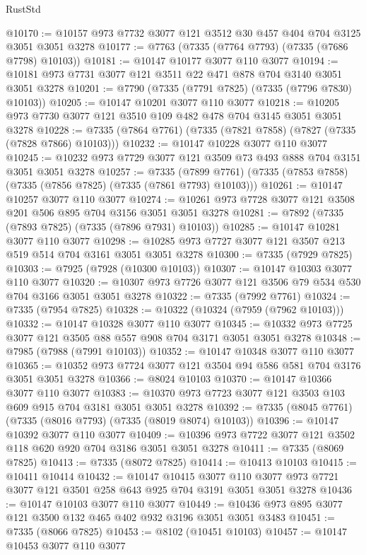 \begin{lexlean}{RustStd}
\begin{coremodule}
{\begin{coremodule}
{{{{{{{{{{{{{{{{{{{{{{{{{{{{{{{{@10170 := @10157 @973 @7732 @3077 @121 @3512 @30 @457 @404 @704 @3125 @3051 @3051 @3278
@10177 := @7763 (@7335 (@7764 @7793) (@7335 (@7686 @7798) @10103))
@10181 := @10147 @10177 @3077 @110 @3077
@10194 := @10181 @973 @7731 @3077 @121 @3511 @22 @471 @878 @704 @3140 @3051 @3051 @3278
@10201 := @7790 (@7335 (@7791 @7825) (@7335 (@7796 @7830) @10103))
@10205 := @10147 @10201 @3077 @110 @3077
@10218 := @10205 @973 @7730 @3077 @121 @3510 @109 @482 @478 @704 @3145 @3051 @3051 @3278
@10228 := @7335 (@7864 @7761) (@7335 (@7821 @7858) (@7827 (@7335 (@7828 @7866) @10103)))
@10232 := @10147 @10228 @3077 @110 @3077
@10245 := @10232 @973 @7729 @3077 @121 @3509 @73 @493 @888 @704 @3151 @3051 @3051 @3278
@10257 := @7335
    (@7899 @7761)
    (@7335 (@7853 @7858) (@7335 (@7856 @7825) (@7335 (@7861 @7793) @10103)))
@10261 := @10147 @10257 @3077 @110 @3077
@10274 := @10261 @973 @7728 @3077 @121 @3508 @201 @506 @895 @704 @3156 @3051 @3051 @3278
@10281 := @7892 (@7335 (@7893 @7825) (@7335 (@7896 @7931) @10103))
@10285 := @10147 @10281 @3077 @110 @3077
@10298 := @10285 @973 @7727 @3077 @121 @3507 @213 @519 @514 @704 @3161 @3051 @3051 @3278
@10300 := @7335 (@7929 @7825)
@10303 := @7925 (@7928 (@10300 @10103))
@10307 := @10147 @10303 @3077 @110 @3077
@10320 := @10307 @973 @7726 @3077 @121 @3506 @79 @534 @530 @704 @3166 @3051 @3051 @3278
@10322 := @7335 (@7992 @7761)
@10324 := @7335 (@7954 @7825)
@10328 := @10322 (@10324 (@7959 (@7962 @10103)))
@10332 := @10147 @10328 @3077 @110 @3077
@10345 := @10332 @973 @7725 @3077 @121 @3505 @88 @557 @908 @704 @3171 @3051 @3051 @3278
@10348 := @7985 (@7988 (@7991 @10103))
@10352 := @10147 @10348 @3077 @110 @3077
@10365 := @10352 @973 @7724 @3077 @121 @3504 @94 @586 @581 @704 @3176 @3051 @3051 @3278
@10366 := @8024 @10103
@10370 := @10147 @10366 @3077 @110 @3077
@10383 := @10370 @973 @7723 @3077 @121 @3503 @103 @609 @915 @704 @3181 @3051 @3051 @3278
@10392 := @7335 (@8045 @7761) (@7335 (@8016 @7793) (@7335 (@8019 @8074) @10103))
@10396 := @10147 @10392 @3077 @110 @3077
@10409 := @10396 @973 @7722 @3077 @121 @3502 @118 @620 @920 @704 @3186 @3051 @3051 @3278
@10411 := @7335 (@8069 @7825)
@10413 := @7335 (@8072 @7825)
@10414 := @10413 @10103
@10415 := @10411 @10414
@10432 := @10147
    @10415
    @3077
    @110
    @3077
    @973
    @7721
    @3077
    @121
    @3501
    @258
    @643
    @925
    @704
    @3191
    @3051
    @3051
    @3278
@10436 := @10147 @10103 @3077 @110 @3077
@10449 := @10436 @973 @895 @3077 @121 @3500 @132 @465 @402 @932 @3196 @3051 @3051 @3483
@10451 := @7335 (@8066 @7825)
@10453 := @8102 (@10451 @10103)
@10457 := @10147 @10453 @3077 @110 @3077
}}}}}}}}}}}}}}}}}}}}}}}}}}}}}}}}
\end{coremodule}}
\end{coremodule}
\end{lexlean}
